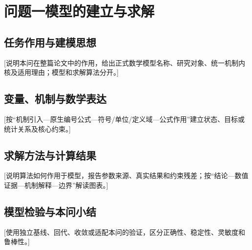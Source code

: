 \section{问题一模型的建立与求解}
\subsection{任务作用与建模思想}
[说明本问在整篇论文中的作用，给出正式数学模型名称、研究对象、统一机制内核及适用理由；模型和求解算法分开。]
\subsection{变量、机制与数学表达}
[按“机制引入—原生编号公式—符号/单位/定义域—公式作用”建立状态、目标或统计关系及核心约束。]
\subsection{求解方法与计算结果}
[说明算法如何作用于模型，报告参数来源、真实结果和约束残差；按“结论—数值证据—机制解释—边界”解读图表。]
\subsection{模型检验与本问小结}
[使用独立基线、回代、收敛或适配本问的验证，区分正确性、稳定性、灵敏度和鲁棒性。]
